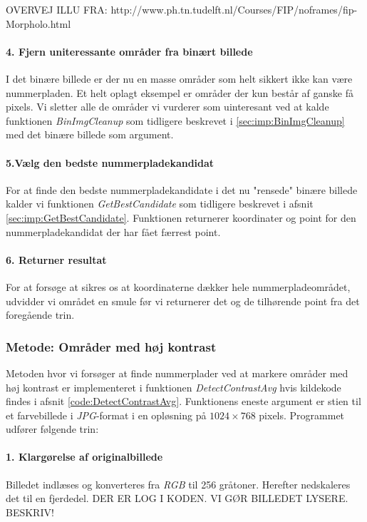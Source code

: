 OVERVEJ ILLU FRA: http://www.ph.tn.tudelft.nl/Courses/FIP/noframes/fip-Morpholo.html

\paragraph{4. Fjern uniteressante områder fra binært billede}
I det binære billede er der nu en masse områder som helt sikkert ikke kan være nummerpladen. Et helt oplagt eksempel er områder der kun består af ganske få pixels. Vi sletter alle de områder vi vurderer som uinteresant ved at kalde funktionen \textit{BinImgCleanup} som tidligere beskrevet i \vref{sec:imp:BinImgCleanup} med det binære billede som argument.

\paragraph{5.Vælg den bedste nummerpladekandidat}
For at finde den bedste nummerpladekandidate i det nu "rensede" binære billede kalder vi funktionen \textit{GetBestCandidate} som tidligere beskrevet i afsnit \vref{sec:imp:GetBestCandidate}. Funktionen returnerer koordinater og point for den nummerpladekandidat der har fået færrest point. 

\paragraph{6. Returner resultat}
For at forsøge at sikres os at koordinaterne dækker hele nummerpladeområdet, udvidder vi området en smule før vi returnerer det og de tilhørende point fra det foregående trin. 


\subsubsection{Metode: Områder med høj kontrast}
Metoden hvor vi forsøger at finde nummerplader ved at markere områder med høj kontrast er implementeret i funktionen \textit{DetectContrastAvg} hvis kildekode findes i afsnit \vref{code:DetectContrastAvg}. Funktionens eneste argument er stien til et farvebillede i \textit{JPG}-format i en opløsning på $1024 \times 768$ pixels. Programmet udfører følgende trin:

\paragraph{1. Klargørelse af originalbillede}
Billedet indlæses og konverteres fra \textit{RGB} til 256 gråtoner. Herefter nedskaleres det til en fjerdedel. DER ER LOG I KODEN. VI GØR BILLEDET LYSERE. BESKRIV!


